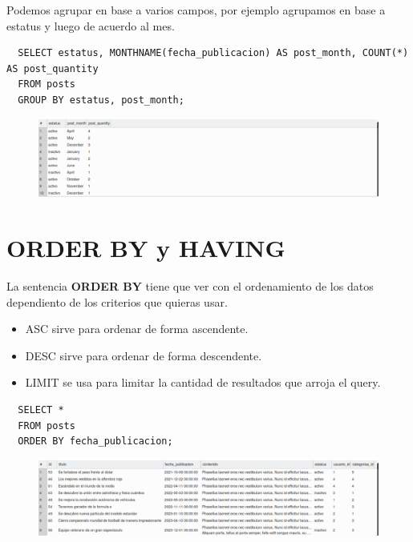 \documentclass{article}
\begin{document}
Podemos agrupar en base a varios campos, por ejemplo agrupamos en base a
estatus y luego de acuerdo al mes.

\begin{verbatim}
  SELECT estatus, MONTHNAME(fecha_publicacion) AS post_month, COUNT(*) AS post_quantity
  FROM posts
  GROUP BY estatus, post_month;
\end{verbatim}

\begin{figure}[h!]
  \centering
  \includegraphics[scale=0.5]{./Pictures/121_group_by_estatus_month.png}
\end{figure}

\newpage

\section{ORDER BY y HAVING}%
La sentencia \textbf{ORDER BY} tiene que ver con el ordenamiento de los datos
dependiento de los criterios que quieras usar.\\

\begin{itemize}
  \item ASC sirve para ordenar de forma ascendente.
  \item DESC sirve para ordenar de forma descendente.
  \item LIMIT se usa para limitar la cantidad de resultados que arroja el query.
\end{itemize}

\begin{verbatim}
  SELECT *
  FROM posts
  ORDER BY fecha_publicacion;
\end{verbatim}

\begin{figure}[h!]
  \centering
  \includegraphics[scale=0.5]{./Pictures/122_order_by.png}
\end{figure}
\end{document}

